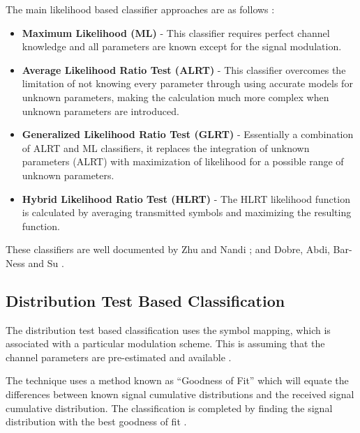 \documentclass[10pt,twocolumn]{witseiepaper}
\begin{document}
	The main likelihood based classifier approaches are as follows \cite{zhu2014automatic}:
	\begin{itemize}
		\item \textbf{Maximum Likelihood (ML)} - This classifier requires perfect channel knowledge and all parameters are known except for the signal modulation.
		\item \textbf{Average Likelihood Ratio Test (ALRT)} - This classifier overcomes the limitation of not knowing every parameter through using accurate models for unknown parameters, making the calculation much more complex when unknown parameters are introduced.
		\item \textbf{Generalized Likelihood Ratio Test (GLRT)} - Essentially a combination of ALRT and ML classifiers, it replaces the integration of unknown parameters (ALRT) with maximization of likelihood for a possible range of unknown parameters.
		\item \textbf{Hybrid Likelihood Ratio Test (HLRT)} - The HLRT likelihood function is calculated by averaging transmitted symbols and maximizing the resulting function.
	\end{itemize}
	These classifiers are well documented by Zhu and Nandi \cite{zhu2014automatic}; and Dobre, Abdi, Bar-Ness and Su \cite{dobre2007survey}. 

	\subsection{Distribution Test Based Classification}
	\label{subsec:distribution}
	
	The distribution test based classification uses the symbol mapping, which is associated with a particular modulation scheme. This is assuming that the channel parameters are pre-estimated and available \cite{zhu2014automatic}.
	
	The technique uses a method known as ``Goodness of Fit'' which will equate the differences between known signal cumulative distributions and the received signal cumulative distribution. The classification is completed by finding the signal distribution with the best goodness of fit \cite{zhu2014automatic}.
	
\end{document}
